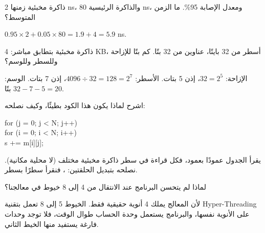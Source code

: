 \begin{tamrin}
    ذاكرة مخبئية زمنها \textenglish{2 ns}، والذاكرة الرئيسية \textenglish{80 ns}، ومعدل الإصابة 95\%. ما الزمن المتوسط؟
\end{tamrin}
\begin{hall}
    $0.95 \times 2 + 0.05 \times 80 = 1.9 + 4 = 5.9$ \textenglish{ns}.
\end{hall}

\begin{tamrin}
    ذاكرة مخبئية بتطابق مباشر: \textenglish{4 KB}، أسطر من 32 بايتًا، عناوين من 32 بتًا. كم بتًا للإزاحة وللسطر وللوسم؟
\end{tamrin}
\begin{hall}
    الإزاحة: $32 = 2^5$، إذن 5 بتات. الأسطر: $4096 \div 32 = 128 = 2^7$، إذن 7 بتات. الوسم: $32 - 7 - 5 = 20$ بتًا.
\end{hall}

\begin{tamrin}
    اشرح لماذا يكون هذا الكود بطيئًا، وكيف نصلحه:
    \begin{codebox}\begin{english}\codefont\small
    for (j = 0; j < N; j++) \\
    \hspace*{2em}for (i = 0; i < N; i++) \\
    \hspace*{4em}s += m[i][j];
    \end{english}\end{codebox}
\end{tamrin}
\begin{hall}
    يقرأ الجدول عمودًا بعمود، فكل قراءة في سطر ذاكرة مخبئية مختلف (لا محلية مكانية). نصلحه بتبديل الحلقتين:
    ، فنقرأ سطرًا بسطر.
\end{hall}

\begin{tamrin}
    لماذا لم يتحسن البرنامج  عند الانتقال من 4 إلى 8 خيوط في معالجنا؟
\end{tamrin}
\begin{hall}
    لأن المعالج يملك 4 أنوية حقيقية فقط. الخيوط 5 إلى 8 تعمل بتقنية \textenglish{Hyper-Threading} على الأنوية نفسها،
    والبرنامج يستعمل وحدة الحساب طوال الوقت، فلا توجد وحدات فارغة يستفيد منها الخيط الثاني.
\end{hall}
